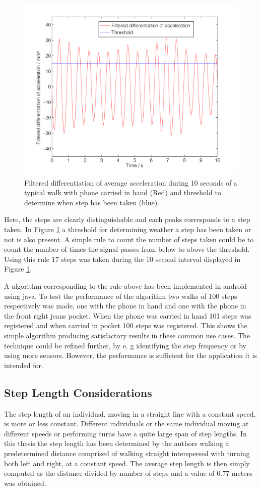 \documentclass{LTHthesis}
\begin{document}
\begin{figure}[!hbt]

\includegraphics[width=1\textwidth ]{images/kinematic/avr_acc_dif_filt}
\caption{Filtered differentiation of average acceleration during 10 seconds of a typical walk with phone carried in hand (Red) and threshold to determine when step has been taken (blue). }\label{avr_acc_dif_filt}
\end{figure}
%
Here, the steps are clearly distinguishable and each peaks corresponds to a step taken. In Figure \ref{avr_acc_dif_filt} a threshold for determining weather a step has been taken or not is also present. A simple rule to count the number of steps taken could be to count the number of times the signal passes from below to above the threshold. Using this rule 17 steps was taken during the 10 second interval displayed in Figure \ref{avr_acc_dif_filt}.

A algorithm corresponding to the rule above has been implemented in android using java. To test the performance of the algorithm two walks of 100 steps respectively was made, one with the phone in hand and one with the phone in the front right jeans pocket. When the phone was carried in hand 101 steps was registered and when carried in pocket 
100 steps was registered. This shows the simple algorithm producing satisfactory results in these common use cases.
The technique could be refined further, by e. g identifying the step frequency or by using more sensors. However, the performance is sufficient for the application it is intended for.  
%
\subsection{Step Length Considerations}
\label{subsec:step_len}
%
The step length of an individual, moving in a straight line with a constant speed, is more or less constant. Different individuals or the same individual moving at different speeds or performing turns have a quite large span of step lengths. In this thesis the step length has been determined by the authors walking a predetermined distance comprised of walking straight interspersed with turning both left and right, at a constant speed. The average step length is then simply computed as the distance divided by number of steps and a value of $0.77$ meters was obtained.  
\end{document}
